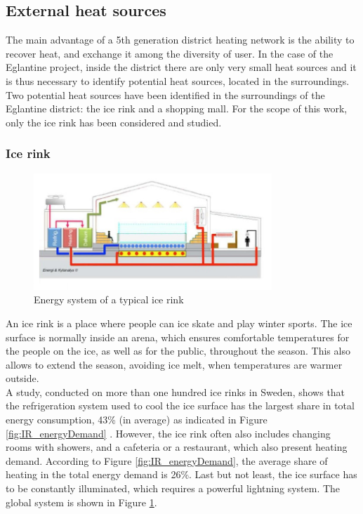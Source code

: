 \documentclass{article}
\begin{document}
\subsection{External heat sources}
The main advantage of a 5th generation district heating network is the ability to recover heat, and exchange it among the diversity of user. In the case of the Eglantine project, inside the district there are only very small heat sources and it is thus necessary to identify potential heat sources, located in the surroundings. 
Two potential heat sources have been identified in the surroundings of the Eglantine district: the ice rink and a shopping mall. For the scope of this work, only the ice rink has been considered and studied.

\subsubsection{Ice rink}

\begin{figure}[htp]
	\centering
	\includegraphics[width=0.8\textwidth]{IR_schema.JPG}
	\caption{Energy system of a typical ice rink \cite{gronqvistComparativeLifecycleCost}}
	\label{fig:IR_schema}
\end{figure}

An ice rink is a place where people can ice skate and play winter sports. The ice surface is normally inside an arena, which ensures comfortable temperatures for the people on the ice, as well as for the public, throughout the season. This also allows to extend the season, avoiding ice melt, when temperatures are warmer outside.\\

A study, conducted on more than one hundred ice rinks in Sweden, shows that the refrigeration system used to cool the ice surface has the largest share in total energy consumption, 43\% (in average) as indicated in Figure \ref{fig:IR_energyDemand} \cite{karampourMEASUREMENTMODELLINGICE}. 
However, the ice rink often also includes changing rooms with showers, and a cafeteria or a restaurant, which also present heating demand. According to Figure \ref{fig:IR_energyDemand}, the average share of heating in the total energy demand is 26\%.
Last but not least, the ice surface has to be constantly illuminated, which requires a powerful lightning system. The global system is shown in Figure \ref{fig:IR_schema}.\\
\end{document}
